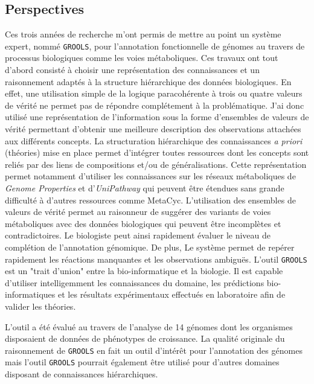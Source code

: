 \begin{refsegment}
\chapter*{Perspectives}

Ces trois années de recherche m'ont permis de mettre au point un système expert, nommé \texttt{\gls{GROOLS}}, pour l'annotation fonctionnelle de génomes au travers de processus biologiques comme les voies métaboliques. Ces travaux ont tout d'abord consisté à choisir une représentation des connaissances et un raisonnement adaptés à la structure hiérarchique des données biologiques. En effet, une utilisation simple de la logique paracohérente à trois ou quatre valeurs de vérité ne permet pas de répondre complétement à la problématique. J'ai donc utilisé une représentation de l'information sous la forme d'ensembles de valeurs de vérité permettant d'obtenir une meilleure description des observations attachées aux différents concepts. La structuration hiérarchique des connaissances \textit{a priori} (théories) mise en place permet d'intégrer toutes ressources dont les concepts sont reliés par des liens de compositions et/ou de généralisations. Cette représentation permet notamment d'utiliser les connaissances sur les réseaux métaboliques  de \textit{Genome Properties} et d'\textit{UniPathway} qui peuvent être étendues sans grande difficulté à d'autres ressources comme MetaCyc. L'utilisation des ensembles de valeurs de vérité permet au raisonneur de suggérer des variants de voies métaboliques avec des données biologiques qui peuvent être incomplètes et contradictoires. Le biologiste peut ainsi rapidement évaluer le niveau de complétion de l'annotation génomique. De plus, Le système permet de repérer rapidement les réactions manquantes et les observations ambiguës. L'outil \texttt{GROOLS} est un "trait d'union" entre la bio-informatique et la biologie. Il est capable d'utiliser intelligemment les connaissances du domaine, les prédictions bio-informatiques et les résultats expérimentaux effectués en laboratoire afin de valider les théories.

L'outil a été évalué au travers de l'analyse de 14 génomes dont les organismes disposaient de données de phénotypes de croissance. La qualité originale du raisonnement de \texttt{\gls{GROOLS}} en fait un outil d'intérêt pour l'annotation des génomes mais l'outil \texttt{\gls{GROOLS}} pourrait également être utilisé pour d'autres domaines disposant de connaissances hiérarchiques.


\end{refsegment}
